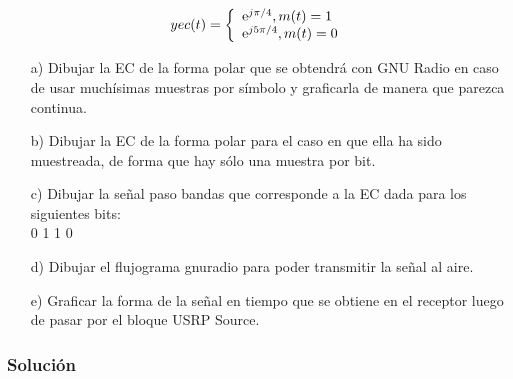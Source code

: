 \begin{equation} \label{capdos_veinticuatro}
yec(t) = \left\lbrace
\begin{array}{ll}
\textup e^{j\pi /4}, m(t)=1  \\
\textup e^{j5\pi /4}, m(t)=0 
\end{array}
\right.
\end{equation}


\begin{itemize}
 \item[a)] Dibujar la EC de la forma polar que se obtendrá con GNU Radio en caso de usar muchísimas muestras por símbolo y graficarla de manera que parezca continua.
 \end{itemize}
 
\begin{itemize}
 \item[b)] Dibujar la EC de la forma polar para el caso en que ella ha sido muestreada, de forma que hay sólo una muestra por bit.
 \end{itemize}


\begin{itemize}
 \item[c)] Dibujar la señal paso bandas que corresponde a la EC dada para los siguientes bits:
 \\
 0 1 1 0
 \end{itemize}

\begin{itemize}
 \item[d)] Dibujar el flujograma gnuradio  para poder transmitir la señal al aire.
 \end{itemize}
 
 \begin{itemize}
 \item[e)] Graficar la forma de la señal en tiempo  que se obtiene en el receptor luego de pasar por el bloque USRP Source.
 \end{itemize}



\subsubsection{Solución}

